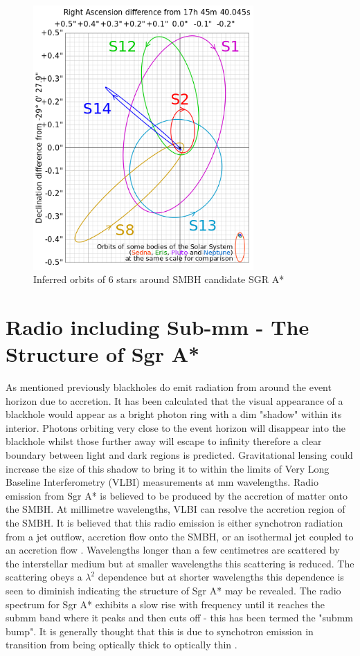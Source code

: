 \documentclass[a4paper,12pt]{article}
\begin{document}
\begin{figure}[H]
\centering
\includegraphics[width=0.75\textwidth]{./orbits}
\caption{Inferred orbits of 6 stars around SMBH candidate SGR A* \citep{eisenhower}}
\label{fig:orbits}
\end{figure}

\section{Radio including Sub-mm - The Structure of Sgr A*}
As mentioned previously blackholes do emit radiation from around the event horizon due to accretion. It has been calculated \citep{falke2} that the visual appearance of a blackhole would appear as a 
bright
photon ring with a dim "shadow" within its interior. Photons orbiting very close to the event horizon will disappear into the blackhole whilst those further away will escape to infinity therefore
a clear boundary between light and dark regions is predicted.
Gravitational lensing could increase the size of this shadow to bring it to within the limits of Very Long Baseline Interferometry (VLBI) measurements at mm wavelengths. 
Radio emission from Sgr A* is believed to be produced by the accretion of matter onto the SMBH. At millimetre wavelengths, VLBI can resolve the accretion region of the SMBH.
It is believed that this radio emission is either synchotron radiation from a jet outflow, accretion flow onto the SMBH, or an isothermal jet coupled to an accretion flow \citep{ortiz}.
Wavelengths longer than a few centimetres are scattered by the interstellar medium but at smaller wavelengths this scattering is reduced. The scattering obeys a $\lambda^2$ dependence \citep{ortiz} but
at shorter wavelengths this dependence is seen to diminish indicating the structure of Sgr A* may be revealed.
The radio spectrum for Sgr A* exhibits a slow rise with frequency until it reaches the submm band where it peaks and then cuts off - this has been termed the "submm bump". It is generally thought that
this is due to synchotron emission in transition from being optically thick to optically thin \citep{falke1}.
\end{document}
